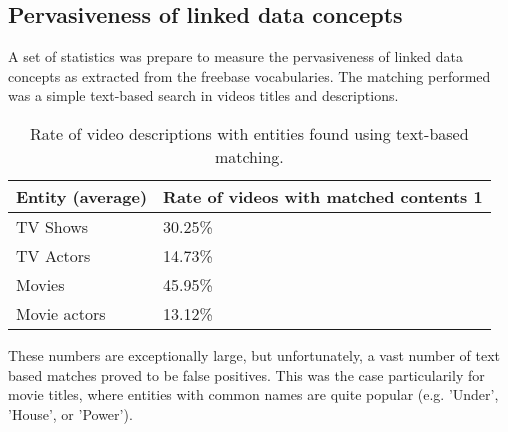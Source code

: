 \subsection{Pervasiveness of linked data concepts}
A set of statistics was prepare to measure the pervasiveness of linked data
concepts as extracted from the freebase vocabularies. The matching performed
was a simple text-based search in videos titles and descriptions.

\begin{center}
  \begin{table}
    \begin{tabular}{ | p{4cm} | p{6cm} | } \hline
      Entity (average) & Rate of videos with matched contents 1 \\ \hline
      TV Shows & 30.25\% \\ \hline
      TV Actors & 14.73\% \\ \hline
      Movies & 45.95\% \\ \hline
      Movie actors & 13.12\% \\ \hline
    \end{tabular}
    \caption{Rate of video descriptions with entities found using text-based matching.}
  \end{table}
\end{center}

These numbers are exceptionally large, but unfortunately, a vast number of text
based matches proved to be false positives. This was the case particularily for
movie titles, where entities with common names are quite popular (e.g. 'Under',
'House', or 'Power').
